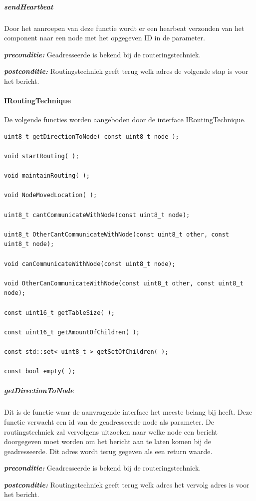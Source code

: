 \documentclass[a4paper, 11pt, oneside]{report}
\begin{document}
\subparagraph{sendHeartbeat}
Door het aanroepen van deze functie wordt er een hearbeat verzonden van het component naar een node met het opgegeven ID in de parameter.

\textbf{\textit{preconditie:}} Geadresseerde is bekend bij de routeringstechniek.

\textbf{\textit{postconditie:}} Routingstechniek geeft terug welk adres de volgende stap is voor het bericht.

\paragraph{IRoutingTechnique}

De volgende functies worden aangeboden door de interface IRoutingTechnique. 

\begin{lstlisting}
uint8_t getDirectionToNode( const uint8_t node );

void startRouting( );

void maintainRouting( );

void NodeMovedLocation( );

uint8_t cantCommunicateWithNode(const uint8_t node);

uint8_t OtherCantCommunicateWithNode(const uint8_t other, const uint8_t node);

void canCommunicateWithNode(const uint8_t node);

void OtherCanCommunicateWithNode(const uint8_t other, const uint8_t node);

const uint16_t getTableSize( );

const uint16_t getAmountOfChildren( );

const std::set< uint8_t > getSetOfChildren( );

const bool empty( );
\end{lstlisting}
\subparagraph{getDirectionToNode}
Dit is de functie waar de aanvragende interface het meeste belang bij heeft.
Deze functie verwacht een id van de geadresseerde node als parameter.
De routingstechniek zal vervolgens uitzoeken naar welke node een bericht doorgegeven moet worden om het bericht aan te laten komen bij de geadresseerde.
Dit adres wordt terug gegeven als een return waarde. 

\textbf{\textit{preconditie:}} Geadresseerde is bekend bij de routeringstechniek.

\textbf{\textit{postconditie:}} Routingstechniek geeft terug welk adres het vervolg adres is voor het bericht.
\end{document}
